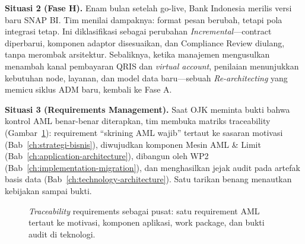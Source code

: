 \textbf{Situasi 2 (Fase H).} Enam bulan setelah go-live, Bank Indonesia merilis
versi baru SNAP BI. Tim menilai dampaknya: format pesan berubah, tetapi pola
integrasi tetap. Ini diklasifikasi sebagai perubahan \emph{Incremental}---contract
diperbarui, komponen adaptor disesuaikan, dan Compliance Review diulang, tanpa
merombak arsitektur. Sebaliknya, ketika manajemen mengusulkan menambah kanal
pembayaran QRIS dan \emph{virtual account}, penilaian menunjukkan kebutuhan node,
layanan, dan model data baru---sebuah \emph{Re-architecting} yang memicu siklus ADM
baru, kembali ke Fase A.

\textbf{Situasi 3 (Requirements Management).} Saat OJK meminta bukti bahwa kontrol
AML benar-benar diterapkan, tim membuka matriks traceability
(Gambar~\ref{fig:requirements-hub}): requirement ``skrining AML wajib'' tertaut ke
sasaran motivasi (Bab~\ref{ch:strategi-bisnis}), diwujudkan komponen Mesin AML \&
Limit (Bab~\ref{ch:application-architecture}), dibangun oleh WP2
(Bab~\ref{ch:implementation-migration}), dan menghasilkan jejak audit pada artefak
basis data (Bab~\ref{ch:technology-architecture}). Satu tarikan benang menautkan
kebijakan sampai bukti.

\begin{figure}[htbp]
\centering
{}
\caption{\emph{Traceability} requirements sebagai pusat: satu requirement AML
tertaut ke motivasi, komponen aplikasi, work package, dan bukti audit di teknologi.}
\label{fig:requirements-hub}
\end{figure}

